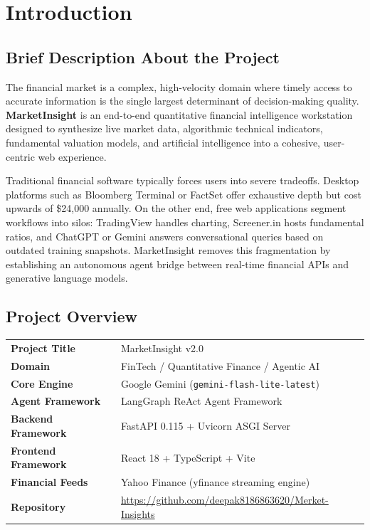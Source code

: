 \documentclass[12pt,a4paper]{report}
\begin{document}
\clearpage
\tableofcontents

\clearpage
\chapter{Introduction}

\section{Brief Description About the Project}

The financial market is a complex, high-velocity domain where timely access to accurate information is the single largest determinant of decision-making quality. \textbf{MarketInsight} is an end-to-end quantitative financial intelligence workstation designed to synthesize live market data, algorithmic technical indicators, fundamental valuation models, and artificial intelligence into a cohesive, user-centric web experience.

Traditional financial software typically forces users into severe tradeoffs. Desktop platforms such as Bloomberg Terminal or FactSet offer exhaustive depth but cost upwards of \$24,000 annually. On the other end, free web applications segment workflows into silos: TradingView handles charting, Screener.in hosts fundamental ratios, and ChatGPT or Gemini answers conversational queries based on outdated training snapshots. MarketInsight removes this fragmentation by establishing an autonomous agent bridge between real-time financial APIs and generative language models.

\section{Project Overview}

\begin{infobox}[title=Project Overview]
\begin{tabular}{@{}ll@{}}
  \textbf{Project Title}       & MarketInsight v2.0 \\[4pt]
  \textbf{Domain}              & FinTech / Quantitative Finance / Agentic AI \\[4pt]
  \textbf{Core Engine}         & Google Gemini (\texttt{gemini-flash-lite-latest}) \\[4pt]
  \textbf{Agent Framework}     & LangGraph ReAct Agent Framework \\[4pt]
  \textbf{Backend Framework}   & FastAPI 0.115 + Uvicorn ASGI Server \\[4pt]
  \textbf{Frontend Framework}  & React 18 + TypeScript + Vite \\[4pt]
  \textbf{Financial Feeds}     & Yahoo Finance (yfinance streaming engine) \\[4pt]
  \textbf{Repository}          & \url{https://github.com/deepak8186863620/Merket-Insights}
\end{tabular}
\end{infobox}
\end{document}
